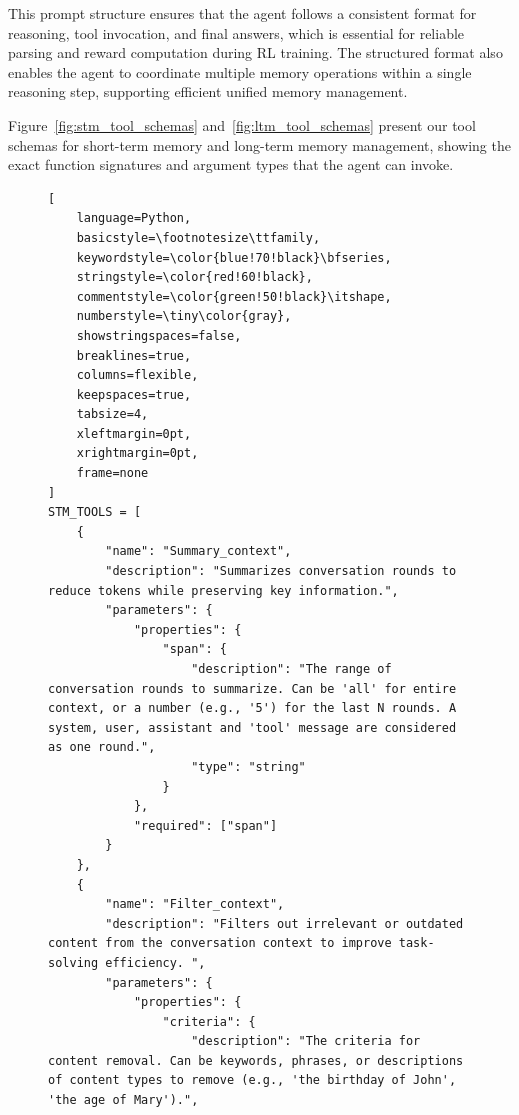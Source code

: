This prompt structure ensures that the agent follows a consistent format for reasoning, tool invocation, and final answers, which is essential for reliable parsing and reward computation during RL training. The structured format also enables the agent to coordinate multiple memory operations within a single reasoning step, supporting efficient unified memory management.

Figure~\ref{fig:stm_tool_schemas} and~\ref{fig:ltm_tool_schemas} present our tool schemas for short-term memory and long-term memory management, showing the exact function signatures and argument types that the agent can invoke.

\begin{figure}[p]
\centering
\begin{tcolorbox}[
    enhanced,
    colback=blue!3!white,
    colframe=blue!40!black,
    fonttitle=\bfseries\sffamily,
    title={\small Short-term Memory (STM) Management Tools},
    coltitle=white,
    attach boxed title to top left={yshift=-2mm, xshift=3mm},
    boxed title style={colback=blue!40!black, sharp corners},
    sharp corners,
    boxrule=0.5pt,
    left=3pt,
    right=3pt,
    top=8pt,
    bottom=3pt,
    arc=0pt
]
\begin{lstlisting}[
    language=Python,
    basicstyle=\footnotesize\ttfamily,
    keywordstyle=\color{blue!70!black}\bfseries,
    stringstyle=\color{red!60!black},
    commentstyle=\color{green!50!black}\itshape,
    numberstyle=\tiny\color{gray},
    showstringspaces=false,
    breaklines=true,
    columns=flexible,
    keepspaces=true,
    tabsize=4,
    xleftmargin=0pt,
    xrightmargin=0pt,
    frame=none
]
STM_TOOLS = [
    {
        "name": "Summary_context",
        "description": "Summarizes conversation rounds to reduce tokens while preserving key information.",
        "parameters": {
            "properties": {
                "span": {
                    "description": "The range of conversation rounds to summarize. Can be 'all' for entire context, or a number (e.g., '5') for the last N rounds. A system, user, assistant and 'tool' message are considered as one round.",
                    "type": "string"
                }
            },
            "required": ["span"]
        }
    },
    {
        "name": "Filter_context",
        "description": "Filters out irrelevant or outdated content from the conversation context to improve task-solving efficiency. ",
        "parameters": {
            "properties": {
                "criteria": {
                    "description": "The criteria for content removal. Can be keywords, phrases, or descriptions of content types to remove (e.g., 'the birthday of John', 'the age of Mary').",

\end{lstlisting}
\end{tcolorbox}
\end{figure}
